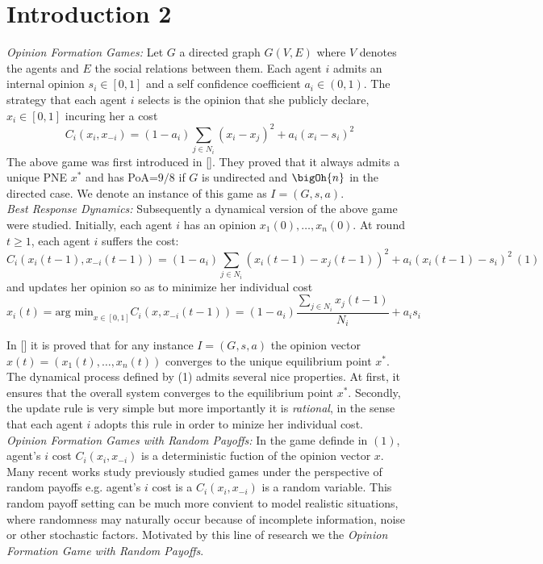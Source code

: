 \section{Introduction 2}

\emph{Opinion Formation Games: }Let $G$ a directed graph $G(V,E)$ where $V$ denotes the agents and $E$ the social relations between them. Each agent $i$ admits an internal opinion $s_i \in [0,1]$ and a self confidence coefficient $a_i \in (0,1)$. The strategy that each agent $i$ selects is the opinion that she publicly declare, $x_i \in [0,1]$ incuring her a cost $$C_i(x_i,x_{-i})=(1-a_i)\sum_{j \in N_i}(x_i -x_j)^2 + a_i(x_i-s_i)^2$$\label{eq:best_response}The above game was first introduced in []. They proved that it always admits a unique PNE $x^*$ and has PoA=$9/8$ if $G$ is undirected and $\bigOh{n}$ in the directed case. We denote an instance of this game as $I=(G,s,a)$.\\

\noindent \emph{Best Response Dynamics: }Subsequently a dynamical version of the above game were studied. Initially, each agent $i$ has an opinion $x_1(0),\ldots,x_n(0)$. At round $t \geq 1$, each agent $i$ suffers the cost: $$C_i(x_i(t-1),x_{-i}(t-1))=(1-a_i)\sum_{j \in N_i}(x_i(t-1) -x_j(t-1))^2 + a_i(x_i(t-1)-s_i)^2~(1)$$ and updates her opinion so as to minimize her individual cost $$x_i(t) = \text{arg min}_{x \in [0,1]} C_i(x,x_{-i}(t-1))=(1-a_i)\frac{\sum_{j \in N_i}x_j(t-1)}{N_i} + a_is_i $$ \label{eq:best_response}


\noindent In [] it is proved that for any instance $I=(G,s,a)$ the opinion vector $x(t)=(x_1(t),\ldots,x_n(t))$ converges to the unique equilibrium point $x^*$.\\

The dynamical process defined by (1) admits several nice properties. At first, it ensures that the overall system converges to the equilibrium point $x^*$. Secondly, the update rule is very simple but more importantly it is \emph{rational}, in the sense that each agent $i$ adopts this rule in order to minize her individual cost.\\

\emph{Opinion Formation Games with Random Payoffs: }In the game definde in $(1)$, agent's $i$ cost $C_i(x_i,x_{-i})$ is a deterministic fuction of the opinion vector $x$. Many recent works study previously studied games under the perspective of random payoffs e.g. agent's $i$ cost is a $C_i(x_i,x_{-i})$ is a random variable. This random payoff setting can be much more convient to model realistic situations, where randomness may naturally occur because of incomplete information, noise or other stochastic factors. Motivated by this line of research we the \emph{Opinion Formation Game with Random Payoffs}. 


